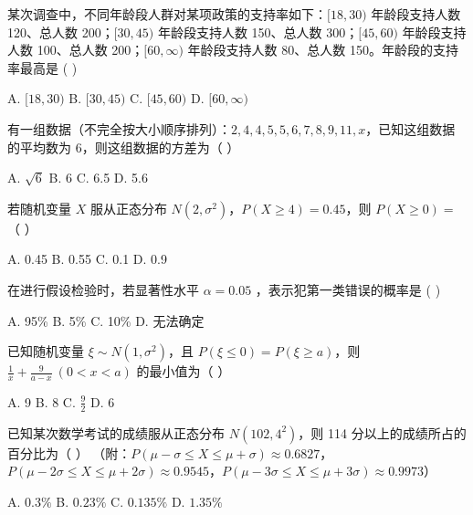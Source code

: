 \documentclass[11pt, a4paper]{article}
\begin{document}
\begin{baitap}[4]
某次调查中，不同年龄段人群对某项政策的支持率如下：$[18,30)$ 年龄段支持人数 120、总人数 200；$[30,45)$ 年龄段支持人数 150、总人数 300；$[45,60)$ 年龄段支持人数 100、总人数 200；$[60, \infty)$ 年龄段支持人数 80、总人数 150。年龄段的支持率最高是 ( )
\par\vspace{3pt}
\noindent A. $[18,30)$ \quad B. $[30,45)$ \quad C. $[45,60)$ \quad D. $[60, \infty)$
\end{baitap}

\begin{baitap}[5]
有一组数据（不完全按大小顺序排列）：$2, 4, 4, 5, 5, 6, 7, 8, 9, 11, x$，已知这组数据的平均数为 6，则这组数据的方差为（ ）
\par\vspace{3pt}
\noindent A. $\sqrt{6}$ \quad B. 6 \quad C. 6.5 \quad D. 5.6
\end{baitap}

\begin{baitap}[6]
若随机变量 $X$ 服从正态分布 $N(2, \sigma^2)$，$P(X \geq 4) = 0.45$，则 $P(X \geq 0) =$（ ）
\par\vspace{3pt}
\noindent A. 0.45 \quad B. 0.55 \quad C. 0.1 \quad D. 0.9
\end{baitap}

\begin{baitap}[7]
在进行假设检验时，若显著性水平 $\alpha = 0.05$ ，表示犯第一类错误的概率是 ( )
\par\vspace{3pt}
\noindent A. 95\% \quad B. 5\% \quad C. 10\% \quad D. 无法确定
\end{baitap}

\begin{baitap}[8]
已知随机变量 $\xi\sim N(1,\sigma^2)$，且 $P(\xi\le0)=P(\xi\ge a)$，则 $\frac{1}{x}+\frac{9}{a-x}\ (0<x<a)$ 的最小值为（ ）
\par\vspace{3pt}
\noindent A. 9 \quad B. 8 \quad C. $\frac{9}{2}$ \quad D. 6
\end{baitap}

\begin{baitap}[9]
已知某次数学考试的成绩服从正态分布 $N(102, 4^2)$，则 114 分以上的成绩所占的百分比为（ ） （附：$P(\mu - \sigma \le X \le \mu + \sigma) \approx 0.6827$，$P(\mu - 2\sigma \le X \le \mu + 2\sigma) \approx 0.9545$，$P(\mu - 3\sigma \le X \le \mu + 3\sigma) \approx 0.9973$）
\par\vspace{3pt}
\noindent A. $0.3\%$ \quad B. $0.23\%$ \quad C. $0.135\%$ \quad D. $1.35\%$
\end{baitap}
\end{document}
